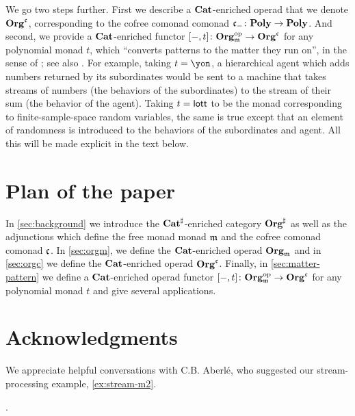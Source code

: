 We go  two steps further. First we describe a $\mathbf{Cat}$-enriched operad \cite{Leinster:2004a} that we denote $\mathbf{Org}^{\mathfrak{c}}$, corresponding to the cofree comonad comonad $\mathfrak{c}_-\colon\mathbf{Poly}\to\mathbf{Poly}$. And second, we provide a $\mathbf{Cat}$-enriched functor $[-,t]\colon\mathbf{Org}_{\mathfrak{m}}^{\textnormal{op}}\to\mathbf{Org}^{\mathfrak{c}}$ for any polynomial monad $t$, which ``converts patterns to the matter they run on'', in the sense of \cite{libkind2024pattern}; see also \cite{Katsumata2020interaction}. For example, taking $t=\yon$, a hierarchical agent which adds numbers returned by its subordinates  would be sent to a machine that takes streams of numbers (the behaviors of the subordinates)  to the stream of their sum (the behavior of the agent). Taking $t=\mathsf{lott}$ to be the monad corresponding to finite-sample-space random variables, the same is true except that an element of randomness is introduced to the behaviors of the subordinates and agent. All this will be made explicit in the text below.


\section*{Plan of the paper}

In \cref{sec:background} we introduce the $\mathbf{Cat}^\sharp$-enriched category $\mathbf{Org}^\sharp$ as well as the adjunctions which define the free monad monad $\mathfrak{m}$ and the cofree comonad comonad $\mathfrak{c}$. 
In \cref{sec:orgm}, we define the $\mathbf{Cat}$-enriched operad $\mathbf{Org}_{\mathfrak{m}}$ and in \cref{sec:orgc} we define the $\mathbf{Cat}$-enriched operad $\mathbf{Org}^{\mathfrak{c}}$. 
Finally, in \cref{sec:matter-pattern} we define a $\mathbf{Cat}$-enriched operad functor $[-, t] \colon \mathbf{Org}_{\mathfrak{m}}^{\textnormal{op}} \to \mathbf{Org}^{\mathfrak{c}}$ for any polynomial monad $t$ and give several applications.

\section*{Acknowledgments}
We appreciate helpful conversations with C.B. Aberl\'e, who suggested our stream-processing example, \cref{ex:stream-m2}.

.